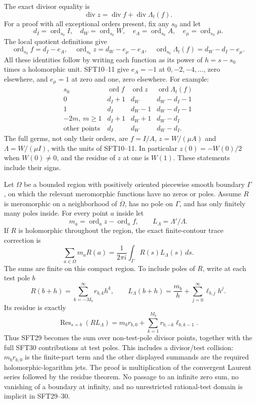 \documentclass[
  10pt,
  a4paper,
]{article}
\begin{document}
The exact divisor equality is \[
 \operatorname{div}z
   =\operatorname{div}f+\operatorname{div}\Lambda_t(f).
 \tag{SFT26}
\] For a proof with all exceptional orders present, fix any \(s_0\) and
let \[
 d_I=\operatorname{ord}_{s_0}I,\quad
 d_W=\operatorname{ord}_{s_0}W,\quad
 e_A=\operatorname{ord}_{s_0}A,\quad
 e_\mu=\operatorname{ord}_{s_0}\mu.
\] The local quotient definitions give \[
 \operatorname{ord}_{s_0}f=d_I-e_A,\quad
 \operatorname{ord}_{s_0}z=d_W-e_\mu-e_A,\quad
 \operatorname{ord}_{s_0}\Lambda_t(f)=d_W-d_I-e_\mu.
 \tag{SFT27}
\] All these identities follow by writing each function as its power of
\(h=s-s_0\) times a holomorphic unit. SFT10--11 give \(e_A=-1\) at
\(0,-2,-4,\ldots\), zero elsewhere, and \(e_\mu=1\) at zero and one,
zero elsewhere. For example: \[
 \begin{array}{c|ccc}
 s_0&\operatorname{ord}f&\operatorname{ord}z&
           \operatorname{ord}\Lambda_t(f)\\ \hline
 0&d_I+1&d_W&d_W-d_I-1\\
 1&d_I&d_W-1&d_W-d_I-1\\
 -2m,\ m\ge1&d_I+1&d_W+1&d_W-d_I\\
 \text{other points}&d_I&d_W&d_W-d_I .
 \end{array}
 \tag{SFT28}
\] The full germs, not only their orders, are \(f=I/A\), \(z=W/(\mu A)\)
and \(\Lambda=W/(\mu I)\), with the units of SFT10--11. In particular
\(z(0)=-W(0)/2\) when \(W(0)\ne0\), and the residue of \(z\) at one is
\(W(1)\). These statements include their signs.

Let \(\Omega\) be a bounded region with positively oriented piecewise
smooth boundary \(\Gamma\), on which the relevant meromorphic functions
have no zeros or poles. Assume \(R\) is meromorphic on a neighborhood of
\(\overline\Omega\), has no pole on \(\Gamma\), and has only finitely
many poles inside. For every point \(a\) inside let \[
 m_a=\operatorname{ord}_a z-\operatorname{ord}_a f,\qquad
 L_\Lambda=\Lambda'/\Lambda.
\] If \(R\) is holomorphic throughout the region, the exact
finite-contour trace correction is \[
 \sum_{a\in\Omega}m_aR(a)
       =\frac1{2\pi i}\int_\Gamma R(s)L_\Lambda(s)\,ds.
 \tag{SFT29}
\] The sums are finite on this compact region. To include poles of
\(R\), write at each test pole \(b\) \[
 R(b+h)=\sum_{k=-M_b}^{\infty}r_{b,k}h^k,\qquad
 L_\Lambda(b+h)=\frac{m_b}{h}
                      +\sum_{j=0}^{\infty}\ell_{b,j}h^j.
\] Its residue is exactly \[
 \operatorname{Res}_{s=b}(RL_\Lambda)
    =m_b r_{b,0}
       +\sum_{k=1}^{M_b}r_{b,-k}\ell_{b,k-1}.
 \tag{SFT30}
\] Thus SFT29 becomes the sum over non-test-pole divisor points,
together with the full SFT30 contributions at test poles. This includes
a divisor/test collision: \(m_br_{b,0}\) is the finite-part term and the
other displayed summands are the required holomorphic-logarithm jets.
The proof is multiplication of the convergent Laurent series followed by
the residue theorem. No passage to an infinite zero sum, no vanishing of
a boundary at infinity, and no unrestricted rational-test domain is
implicit in SFT29--30.
\end{document}
